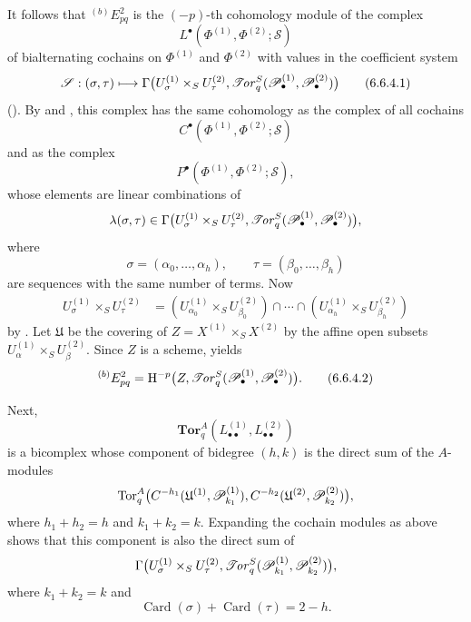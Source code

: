 \begin{env}[6.6.4]
It follows that ${}^{(b)}E_{pq}^2$ is the $(-p)$-th cohomology
module of the complex
\[
  L^\bullet(\Phi^{(1)},\Phi^{(2)};\mathcal S)
\]
of bialternating cochains on $\Phi^{(1)}$ and $\Phi^{(2)}$ with
values in the coefficient system
\[
  \mathscr S:(\sigma,\tau)\longmapsto
  \Gamma\bigl(
    U_\sigma^{(1)}\times_SU_\tau^{(2)},
    \mathscr{T}\!\mathit{or}_q^S(\mathscr{P}_\bullet^{(1)},\mathscr{P}_\bullet^{(2)})
  \bigr)
  \tag{6.6.4.1}\label{III.6.6.4.1}
\]
().  By  and
, this complex has the same cohomology as the
complex of all cochains
\[
  C^\bullet(\Phi^{(1)},\Phi^{(2)};\mathcal S)
\]
and as the complex
\[
  P^\bullet(\Phi^{(1)},\Phi^{(2)};\mathcal S),
\]
whose elements are linear combinations of
\[
  \lambda(\sigma,\tau)\in
  \Gamma\bigl(
    U_\sigma^{(1)}\times_SU_\tau^{(2)},
    \mathscr{T}\!\mathit{or}_q^S(\mathscr{P}_\bullet^{(1)},\mathscr{P}_\bullet^{(2)})
  \bigr),
\]
where
\[
  \sigma=(\alpha_0,\ldots,\alpha_h),
  \qquad
  \tau=(\beta_0,\ldots,\beta_h)
\]
are sequences with the same number of terms.  Now
\[
\begin{split}
  U_\sigma^{(1)}\times_SU_\tau^{(2)}
  &=
  (U_{\alpha_0}^{(1)}\times_SU_{\beta_0}^{(2)})
  \cap\cdots\cap
  (U_{\alpha_h}^{(1)}\times_SU_{\beta_h}^{(2)})
\end{split}
\]
by .  Let $\mathfrak U$ be the covering of
$Z=X^{(1)}\times_SX^{(2)}$ by the affine open subsets
$U_\alpha^{(1)}\times_SU_\beta^{(2)}$.  Since $Z$ is a scheme,
 yields
\[
  {}^{(b)}E_{pq}^2
  =
  \mathrm{H}^{-p}
  \bigl(
    Z,\mathscr{T}\!\mathit{or}_q^S
    (\mathscr{P}_\bullet^{(1)},\mathscr{P}_\bullet^{(2)})
  \bigr).
  \tag{6.6.4.2}\label{III.6.6.4.2}
\]

Next,
\[
  \mathbf{Tor}_q^A
  (L_{\bullet\bullet}^{(1)},L_{\bullet\bullet}^{(2)})
\]
is a bicomplex whose component of bidegree $(h,k)$ is the direct
sum of the $A$-modules
\[
  \operatorname{Tor}_q^A
  \bigl(
    C^{-h_1}(\mathfrak U^{(1)},\mathscr{P}_{k_1}^{(1)}),
    C^{-h_2}(\mathfrak U^{(2)},\mathscr{P}_{k_2}^{(2)})
  \bigr),
\]
where $h_1+h_2=h$ and $k_1+k_2=k$.  Expanding the cochain
modules as above shows that this component is also the direct
sum of
\[
  \Gamma\bigl(
    U_\sigma^{(1)}\times_SU_\tau^{(2)},
    \mathscr{T}\!\mathit{or}_q^S(\mathscr{P}_{k_1}^{(1)},\mathscr{P}_{k_2}^{(2)})
  \bigr),
\]
where $k_1+k_2=k$ and
\[
  \operatorname{Card}(\sigma)
  +\operatorname{Card}(\tau)=2-h.
\]


\end{env}

